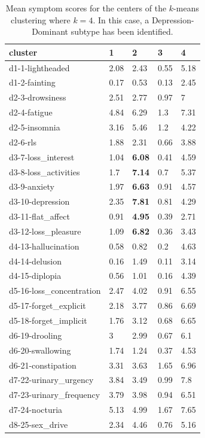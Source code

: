 \documentclass[10pt]{article}
\begin{document}
\begin{multicols}{2}
\begin{table}[b]
  \centering
  \caption{Mean symptom scores for the centers of the $k$-means clustering where $k = 4$. In
  this case, a Depression-Dominant subtype has been identified.}
  \label{tab:nms30_k4}
  \begin{tabular}{l|l|l|l|l}
cluster & 1 & 2 & 3 & 4 \\
\hline
d1-1-lightheaded & 2.08 & 2.43 & 0.55 & 5.18 \\
d1-2-fainting & 0.17 & 0.53 & 0.13 & 2.45 \\
d2-3-drowsiness & 2.51 & 2.77 & 0.97 & 7 \\
d2-4-fatigue & 4.84 & 6.29 & 1.3 & 7.31 \\
d2-5-insomnia & 3.16 & 5.46 & 1.2 & 4.22 \\
d2-6-rls & 1.88 & 2.31 & 0.66 & 3.88 \\
d3-7-loss\_interest & 1.04 & \textbf{6.08} & 0.41 & 4.59 \\
d3-8-loss\_activities & 1.7 & \textbf{7.14} & 0.7 & 5.37 \\
d3-9-anxiety & 1.97 & \textbf{6.63} & 0.91 & 4.57 \\
d3-10-depression & 2.35 & \textbf{7.81} & 0.81 & 4.29 \\
d3-11-flat\_affect & 0.91 & \textbf{4.95} & 0.39 & 2.71 \\
d3-12-loss\_pleasure & 1.09 & \textbf{6.82} & 0.36 & 3.43 \\
d4-13-hallucination & 0.58 & 0.82 & 0.2 & 4.63 \\
d4-14-delusion & 0.16 & 1.49 & 0.11 & 3.14 \\
d4-15-diplopia & 0.56 & 1.01 & 0.16 & 4.39 \\
d5-16-loss\_concentration & 2.47 & 4.02 & 0.91 & 6.55 \\
d5-17-forget\_explicit & 2.18 & 3.77 & 0.86 & 6.69 \\
d5-18-forget\_implicit & 1.76 & 3.12 & 0.68 & 6.65 \\
d6-19-drooling & 3 & 2.99 & 0.67 & 6.1 \\
d6-20-swallowing & 1.74 & 1.24 & 0.37 & 4.53 \\
d6-21-constipation & 3.31 & 3.63 & 1.65 & 6.96 \\
d7-22-urinary\_urgency & 3.84 & 3.49 & 0.99 & 7.8 \\
d7-23-urinary\_frequency & 3.79 & 3.98 & 0.94 & 6.51 \\
d7-24-nocturia & 5.13 & 4.99 & 1.67 & 7.65 \\
d8-25-sex\_drive & 2.34 & 4.46 & 0.76 & 5.16 \\

\end{tabular}
\end{table}
\end{multicols}
\end{document}
